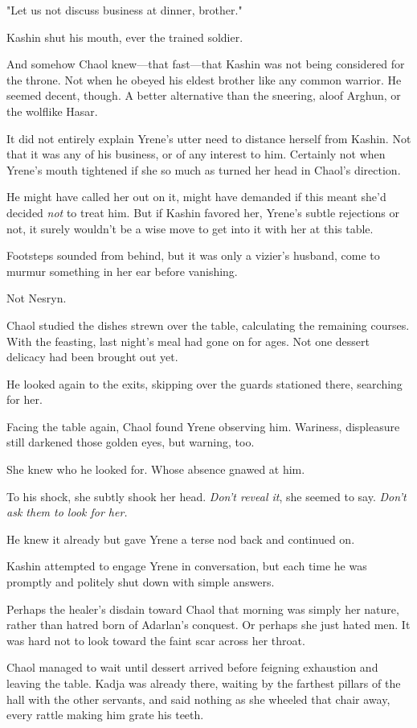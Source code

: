 "Let us not discuss business at dinner, brother."

Kashin shut his mouth, ever the trained soldier.

And somehow Chaol knew---that fast---that Kashin was not being considered for the throne. Not when he obeyed his eldest brother like any common warrior. He seemed decent, though. A better alternative than the sneering, aloof Arghun, or the wolflike Hasar.

It did not entirely explain Yrene's utter need to distance herself from Kashin. Not that it was any of his business, or of any interest to him. Certainly not when Yrene's mouth tightened if she so much as turned her head in Chaol's direction.

He might have called her out on it, might have demanded if this meant she'd decided \emph{not} to treat him. But if Kashin favored her, Yrene's subtle rejections or not, it surely wouldn't be a wise move to get into it with her at this table.

Footsteps sounded from behind, but it was only a vizier's husband, come to murmur something in her ear before vanishing.

Not Nesryn.

Chaol studied the dishes strewn over the table, calculating the remaining courses. With the feasting, last night's meal had gone on for ages. Not one dessert delicacy had been brought out yet.

He looked again to the exits, skipping over the guards stationed there, searching for her.

Facing the table again, Chaol found Yrene observing him. Wariness, displeasure still darkened those golden eyes, but  warning, too.

She knew who he looked for. Whose absence gnawed at him.

To his shock, she subtly shook her head. \emph{Don't reveal it}, she seemed to say. \emph{Don't ask them to look for her.}

He knew it already but gave Yrene a terse nod back and continued on.

Kashin attempted to engage Yrene in conversation, but each time he was promptly and politely shut down with simple answers.

Perhaps the healer's disdain toward Chaol that morning was simply her nature, rather than hatred born of Adarlan's conquest. Or perhaps she just hated men. It was hard not to look toward the faint scar across her throat.

Chaol managed to wait until dessert arrived before feigning exhaustion and leaving the table. Kadja was already there, waiting by the farthest pillars of the hall with the other servants, and said nothing as she wheeled that chair away, every rattle making him grate his teeth.

